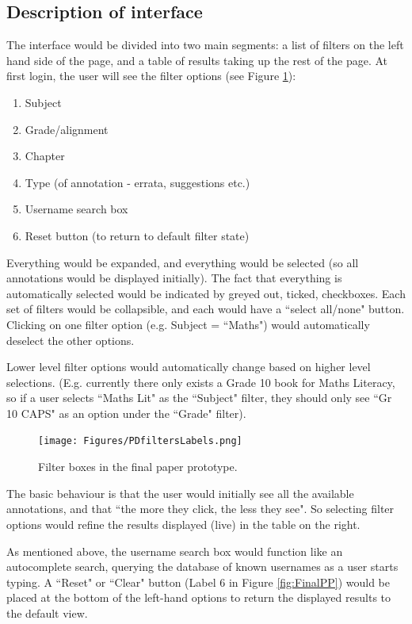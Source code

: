 \subsection{Description of interface}
The interface would be divided into two main segments: a list of filters on the left hand side of the page, and a table of results taking up the rest of the page. At first login, the user will see the filter options (see Figure \ref{fig:FilterBoxes}):
\begin{enumerate}
 \item Subject
 \item Grade/alignment 
 \item Chapter
 \item Type (of annotation - errata, suggestions etc.)
 \item Username search box
 \item Reset button (to return to default filter state)
\end{enumerate}

Everything would be expanded, and everything would be selected (so all annotations would be displayed initially). The fact that everything is automatically selected would be indicated by greyed out, ticked, checkboxes. Each set of filters would be collapsible, and each would have a ``select all/none" button. Clicking on one filter option (e.g. Subject = ``Maths") would automatically deselect the other options. 

Lower level filter options would automatically change based on higher level selections. (E.g. currently there only exists a Grade 10 book for Maths Literacy, so if a user selects ``Maths Lit" as the ``Subject" filter, they should only see ``Gr 10 CAPS" as an option under the ``Grade" filter). 

\begin{figure}[h!]
    \centering
    \texttt{[image: Figures/PDfiltersLabels.png]}
 \caption{Filter boxes in the final paper prototype.}
 \label{fig:FilterBoxes}
\end{figure}

The basic behaviour is that the user would initially see all the available annotations, and that ``the more they click, the less they see". So selecting filter options would refine the results displayed (live) in the table on the right. 

As mentioned above, the username search box would function like an autocomplete search, querying the database of known usernames as a user starts typing. A ``Reset" or ``Clear" button (Label 6 in Figure \ref{fig:FinalPP}) would be placed at the bottom of the left-hand options to return the displayed results to the default view. 

